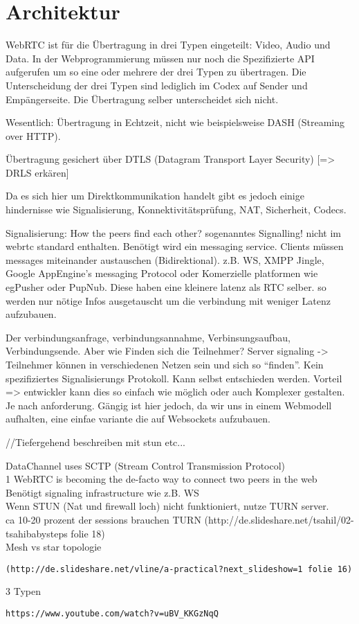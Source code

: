 \section{Architektur}
WebRTC ist für die Übertragung in drei Typen eingeteilt: Video, Audio und Data. In der Webprogrammierung müssen nur noch die Spezifizierte API aufgerufen um so eine oder mehrere der drei Typen zu übertragen. Die Unterscheidung der drei Typen sind lediglich im Codex auf Sender und Empängerseite. Die Übertragung selber unterscheidet sich nicht. 
 
Wesentlich: Übertragung in Echtzeit, nicht wie beispielsweise DASH (Streaming over HTTP).

Übertragung gesichert über DTLS (Datagram Transport Layer Security) [=> DRLS erkären]

Da es sich hier um Direktkommunikation handelt gibt es jedoch einige hindernisse wie Signalisierung, Konnektivitätsprüfung, NAT, Sicherheit, Codecs.

Signalisierung: 
How the peers find each other? sogenanntes Signalling! nicht im webrtc standard enthalten. Benötigt wird ein messaging service. Clients müssen messages miteinander austauschen (Bidirektional). z.B. WS, XMPP Jingle, Google AppEngine's messaging Protocol oder Komerzielle platformen wie egPusher oder PupNub. Diese haben eine kleinere latenz als RTC selber. so werden nur nötige Infos ausgetauscht um die verbindung mit weniger Latenz aufzubauen.

Der verbindungsanfrage, verbindungsannahme, Verbinsungsaufbau,  Verbindungsende. Aber wie Finden sich die Teilnehmer? Server signaling -> Teilnehmer können in verschiedenen Netzen sein und sich so "`finden"'. Kein spezifiziertes Signalisierungs Protokoll. Kann selbst entschieden werden. Vorteil => entwickler kann dies so einfach wie möglich oder auch Komplexer gestalten. Je nach anforderung. Gängig ist hier jedoch, da wir uns in einem Webmodell aufhalten, eine einfae variante die auf Websockets aufzubauen.

//Tiefergehend beschreiben mit stun etc...



DataChannel uses SCTP (Stream Control Transmission Protocol) \\1
WebRTC is becoming the de-facto way to connect two peers in the web \\
Benötigt signaling infrastructure wie z.B. WS\\
Wenn STUN (Nat und firewall loch) nicht funktioniert, nutze TURN server.\\
ca 10-20 prozent der sessions brauchen TURN (http://de.slideshare.net/tsahil/02-tsahibabysteps folie 18) \\
Mesh vs star topologie \begin{verbatim}(http://de.slideshare.net/vline/a-practical?next_slideshow=1 folie 16)\end{verbatim}
3 Typen \begin{verbatim}https://www.youtube.com/watch?v=uBV_KKGzNqQ\end{verbatim} 

